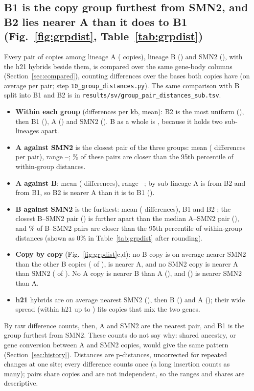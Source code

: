 \subsection{B1 is the copy group furthest from SMN2, and B2 lies nearer A than it does to B1 (Fig.~\ref{fig:grpdist}, Table~\ref{tab:grpdist})}\label{sec:grpdist}
Every pair of copies among lineage A (\linA{} copies), lineage B (\linB) and SMN2 (\gdNTwo), with the \gdNHtw{} h21
hybrids beside them, is compared over the same \nGeneCols{} gene-body columns (Section~\ref{sec:compared}), counting
differences over the bases both copies have (on average \gdBases{} per pair; step \texttt{10\_group\_distances.py}).
The same comparison with B split into B1 and B2 is in \texttt{results/sv/group\_pair\_distances\_sub.tsv}.
\begin{itemize}
\item \textbf{Within each group} (differences per kb, mean): B2 is the most uniform (\gsBtwoBtwo), then B1
(\gsBoneBone), A (\gsAA) and SMN2 (\gdTwoTwoMean). B as a whole is \gdBBMean, because it holds two sub-lineages
\gsBoneBtwo{} apart.
\item \textbf{A against SMN2} is the closest pair of the three groups: mean \gdATwoMean{} (\gdATwoDiffs{} differences per
pair), range \gdATwoMin--\gdATwoMax; \gdATwoBelow\% of these pairs are closer than the 95th percentile of
within-group distances.
\item \textbf{A against B}: mean \gdABMean{} (\gdABDiffs{} differences), range \gdABMin--\gdABMax; by sub-lineage A is
\gsABtwo{} from B2 and \gsABone{} from B1, so B2 is nearer A than it is to B1 (\gsBoneBtwo).
\item \textbf{B against SMN2} is the furthest: mean \gdBTwoMean{} (\gdBTwoDiffs{} differences), B1 \gsBoneTwo{} and B2
\gsBtwoTwo; the closest B--SMN2 pair (\gdBTwoMin) is further apart than the median A--SMN2 pair (\gdATwoMed), and
\gdBTwoBelowFine\% of B--SMN2 pairs are closer than the 95th percentile of within-group distances (shown as 0\% in
Table~\ref{tab:grpdist} after rounding).
\item \textbf{Copy by copy} (Fig.~\ref{fig:grpdist}c,d): no B copy is on average nearer SMN2 than the other B copies
(\gdBNearTwo{} of \linB), \gdBNearA{} is nearer A, and no SMN2 copy is nearer A than SMN2 (\gdTwoNearA{} of \gdNTwo).
No A copy is nearer B than A (\gdANearB), and \gdANearTwo{} (\gdANearTwoHap) is nearer SMN2 than A.
\item \textbf{h21} hybrids are on average nearest SMN2 (\gdTwoHtwMean), then B (\gdBHtwMean) and A (\gdAHtwMean);
their wide spread (within h21 up to \gdHtwHtwMax) fits copies that mix the two genes.
\end{itemize}
By raw difference counts, then, A and SMN2 are the nearest pair, and B1 is the group furthest from SMN2. These counts do
not say why: shared ancestry, or gene conversion between A and SMN2 copies, would give the same pattern
(Section~\ref{sec:history}). Distances are p-distances, uncorrected for repeated changes at one site; every
difference counts once (a long insertion counts as many); pairs share copies and are not independent, so the ranges
and shares are descriptive.

